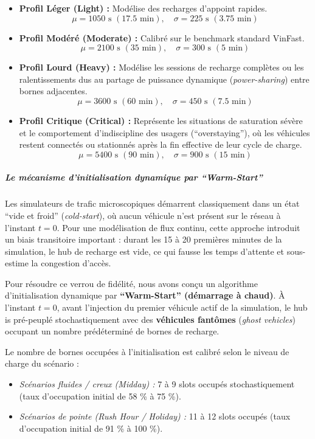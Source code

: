 \documentclass[10pt, a4paper]{article}
\providecommand{\tightlist}{}
\begin{document}
\begin{itemize}
\tightlist
\item
  \textbf{Profil Léger (Light) :} Modélise des recharges d'appoint
  rapides.
  \[\mu = 1050 \text{ s } (17.5 \text{ min}), \quad \sigma = 225 \text{ s } (3.75 \text{ min})\]
\item
  \textbf{Profil Modéré (Moderate) :} Calibré sur le benchmark standard
  VinFast.
  \[\mu = 2100 \text{ s } (35 \text{ min}), \quad \sigma = 300 \text{ s } (5 \text{ min})\]
\item
  \textbf{Profil Lourd (Heavy) :} Modélise les sessions de recharge
  complètes ou les ralentissements dus au partage de puissance dynamique
  (\emph{power-sharing}) entre bornes adjacentes.
  \[\mu = 3600 \text{ s } (60 \text{ min}), \quad \sigma = 450 \text{ s } (7.5 \text{ min})\]
\item
  \textbf{Profil Critique (Critical) :} Représente les situations de
  saturation sévère et le comportement d'indiscipline des usagers
  (``overstaying''), où les véhicules restent connectés ou stationnés
  après la fin effective de leur cycle de charge.
  \[\mu = 5400 \text{ s } (90 \text{ min}), \quad \sigma = 900 \text{ s } (15 \text{ min})\]
\end{itemize}

\subparagraph{Le mécanisme d'initialisation dynamique par
``Warm-Start''}\label{le-muxe9canisme-dinitialisation-dynamique-par-warm-start}

Les simulateurs de trafic microscopiques démarrent classiquement dans un
état ``vide et froid'' (\emph{cold-start}), où aucun véhicule n'est
présent sur le réseau à l'instant \(t = 0\). Pour une modélisation de
flux continu, cette approche introduit un biais transitoire important :
durant les 15 à 20 premières minutes de la simulation, le hub de
recharge est vide, ce qui fausse les temps d'attente et sous-estime la
congestion d'accès.

Pour résoudre ce verrou de fidélité, nous avons conçu un algorithme
d'initialisation dynamique par \textbf{``Warm-Start'' (démarrage à
chaud)}. À l'instant \(t=0\), avant l'injection du premier véhicule
actif de la simulation, le hub is pré-peuplé stochastiquement avec des
\textbf{véhicules fantômes} (\emph{ghost vehicles}) occupant un nombre
prédéterminé de bornes de recharge.

Le nombre de bornes occupées à l'initialisation est calibré selon le
niveau de charge du scénario :

\begin{itemize}
\tightlist
\item
  \emph{Scénarios fluides / creux (Midday) :} 7 à 9 slots occupés
  stochastiquement (taux d'occupation initial de 58 \% à 75 \%).
\item
  \emph{Scénarios de pointe (Rush Hour / Holiday) :} 11 à 12 slots
  occupés (taux d'occupation initial de 91 \% à 100 \%).
\end{itemize}
\end{document}

